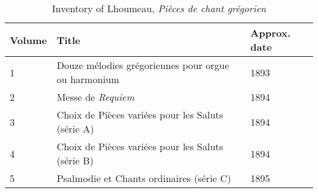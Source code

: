 \begin{table}[ht]
\centering
\footnotesize
\caption{Inventory of Lhoumeau, \emph{Pièces de chant grégorien}}
\label{tab:lhoumeau-pieces}
\begin{tabular}{lll}
\toprule
Volume & Title & Approx. date \\ \midrule
1 & Douze mélodies grégoriennes pour orgue ou harmonium & 1893 \\
2 & Messe de \emph{Requiem} & 1894 \\
3 & Choix de Pièces variées pour les Saluts (série A) & 1894 \\
4 & Choix de Pièces variées pour les Saluts (série B) & 1894  \\
5 & Psalmodie et Chants ordinaires (série C) & 1895 \\ \bottomrule
\end{tabular}
\end{table}
